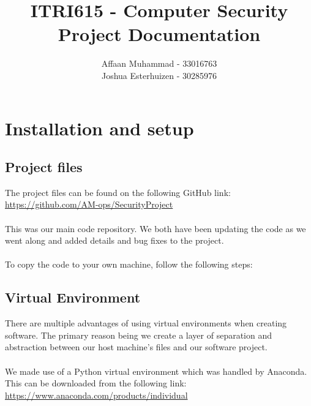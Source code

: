 \documentclass[a4paper, 12pt, titlepage]{report}
\begin{document}
\linespread{1.25}
\author{Affaan Muhammad - 33016763\\Joshua Esterhuizen - 30285976}
\title{ITRI615 - Computer Security\\Project Documentation}
\date{}
\maketitle
\tableofcontents{}

\chapter{Installation and setup}
\section{Project files}
The project files can be found on the following GitHub link:\\
\url{https://github.com/AM-ops/SecurityProject}
\\\\This was our main code repository. We both have been updating the code as we went along and added details and bug fixes to the project.\\\\
To copy the code to your own machine, follow the following steps:
\section{Virtual Environment}
There are multiple advantages of using virtual environments when creating software. The primary reason being we create a layer of separation and abstraction between our host machine's files and our software project.\\\\
We made use of a Python virtual environment which was handled by Anaconda. This can be downloaded from the following link:\\
\url{https://www.anaconda.com/products/individual}
\end{document}
